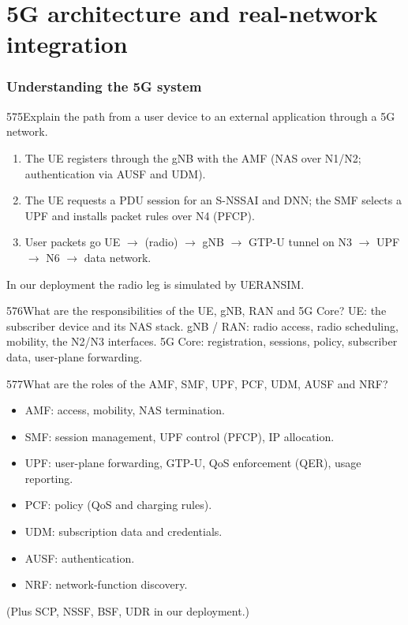 \part{5G architecture and real-network integration}

\FigFiveG

\section{Understanding the 5G system}

\begin{qa}{575}{Explain the path from a user device to an external application through a 5G network.}
\begin{enumerate}
\item The UE registers through the gNB with the AMF (NAS over N1/N2; authentication via AUSF and UDM).
\item The UE requests a PDU session for an S-NSSAI and DNN; the SMF selects a UPF and installs packet rules over N4
(PFCP).
\item User packets go UE $\rightarrow$ (radio) $\rightarrow$ gNB $\rightarrow$ GTP-U tunnel on N3 $\rightarrow$ UPF
$\rightarrow$ N6 $\rightarrow$ data network.
\end{enumerate}
In our deployment the radio leg is simulated by UERANSIM.
\end{qa}

\begin{qa}{576}{What are the responsibilities of the UE, gNB, RAN and 5G Core?}
UE: the subscriber device and its NAS stack. gNB / RAN: radio access, radio scheduling, mobility, the N2/N3 interfaces.
5G Core: registration, sessions, policy, subscriber data, user-plane forwarding.
\end{qa}

\begin{qa}{577}{What are the roles of the AMF, SMF, UPF, PCF, UDM, AUSF and NRF?}
\begin{itemize}
\item AMF: access, mobility, NAS termination.
\item SMF: session management, UPF control (PFCP), IP allocation.
\item UPF: user-plane forwarding, GTP-U, QoS enforcement (QER), usage reporting.
\item PCF: policy (QoS and charging rules).
\item UDM: subscription data and credentials.
\item AUSF: authentication.
\item NRF: network-function discovery.
\end{itemize}
(Plus SCP, NSSF, BSF, UDR in our deployment.)
\end{qa}

